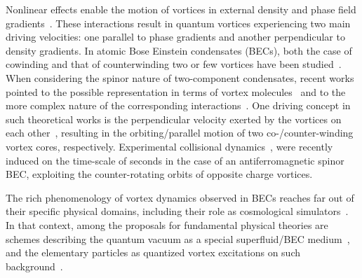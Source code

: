 \documentclass[aps,prb,twocolumn,superscriptaddress,nofootinbib]{revtex4}
\def\editr#1{#1}
\def\edstrike#1{}
\begin{document}
Nonlinear effects enable the motion of vortices in external
density and phase field gradients~\cite{kivshar_dynamics_1998}.
%
These interactions result in quantum vortices experiencing two main
driving velocities: one parallel to phase gradients and another
perpendicular to density gradients.
%
In atomic Bose Einstein condensates (BECs), both the case of cowinding and
that of counterwinding two or few vortices
have been studied~\cite{navarro_dynamics_2013,torres_dynamics_2011,theo,li_dynamics_2016,middelkamp_guiding-center_2011}.
When considering the spinor nature of two-component condensates,
recent works pointed to the possible representation in terms of
vortex molecules~\cite{nitta_vortex_2014, kasamatsu_vortex_2004}
and to the more complex nature of the corresponding
interactions~\cite{pshenichnyuk_pair_2017,tylutki_confinement_2016,kasamatsu_short-range_2016,eto_interaction_2011}.
%
One driving concept in such theoretical works
is the perpendicular velocity exerted by the vortices on each other~\cite{calderaro_vortex_2017},
resulting in the orbiting/parallel motion of two co-/counter-winding vortex cores, respectively.
%
Experimental collisional dynamics~\cite{seo_collisional_2016},
were recently induced on the time-scale of seconds
in the case of an antiferromagnetic spinor BEC,
exploiting the counter-rotating orbits of opposite charge vortices.
\edstrike{However, to the best of our knowledge,
the fundamental interactions between
vortices in spinorial condensates have not been studied yet
despite their importance.}
%
\edstrike{Indeed the} \editr{The} rich phenomenology of vortex dynamics observed in BECs reaches far
out of their specific physical domains, including their role as
cosmological simulators~\cite{Zurek1985,jeff}.
In that context, among the \edstrike{most challenging} proposals for \editr{fundamental} \edstrike{new} physical theories
are schemes describing the quantum vacuum as a special superfluid/BEC
medium~\cite{Huang20161,fedi_superfluid_2016,sbitnev_hydrodynamics_2016_I},
and the elementary particles as quantized vortex excitations on such background~\cite{sbitnev_hydrodynamics_2016_II}.
\end{document}
